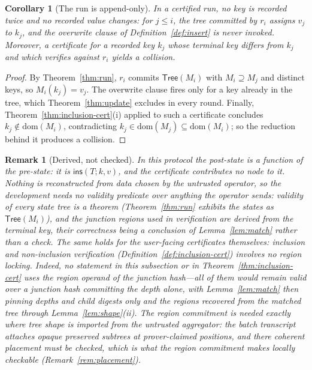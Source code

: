 \documentclass[11pt]{article}
\newtheorem{corollary}{Corollary}
\newtheorem{remark}{Remark}
\begin{document}
\begin{corollary}[The run is append-only]
\label{cor:run-append}
In a certified run, no key is recorded twice and no recorded value changes: for $j \le i$, the tree committed by $r_i$ assigns $v_j$ to $k_j$, and the overwrite clause of Definition~\ref{def:insert} is never invoked. Moreover, a certificate for a recorded key $k_j$ whose terminal key differs from $k_j$ and which verifies against $r_i$ yields a collision.
\end{corollary}
\begin{proof}
By Theorem~\ref{thm:run}, $r_i$ commits $\mathsf{Tree}(M_i)$ with $M_i \supseteq M_j$ and distinct keys, so $M_i(k_j) = v_j$. The overwrite clause fires only for a key already in the tree, which Theorem~\ref{thm:update} excludes in every round. Finally, Theorem~\ref{thm:inclusion-cert}(i) applied to such a certificate concludes $k_j \notin \mathrm{dom}(M_i)$, contradicting $k_j \in \mathrm{dom}(M_j) \subseteq \mathrm{dom}(M_i)$; so the reduction behind it produces a collision.
\end{proof}

\begin{remark}[Derived, not checked]
\label{rem:derived-vs-checked}
In this protocol the post-state is a function of the pre-state: it is $\mathsf{ins}(T;k,v)$, and the certificate contributes no node to it. Nothing is reconstructed from data chosen by the untrusted operator, so the development needs no validity predicate over anything the operator sends: validity of every state tree is a theorem (Theorem~\ref{thm:run} exhibits the states as $\mathsf{Tree}(M_i)$), and the junction regions used in verification are derived from the terminal key, their correctness being a conclusion of Lemma~\ref{lem:match} rather than a check. The same holds for the user-facing certificates themselves: inclusion and non-inclusion verification (Definition~\ref{def:inclusion-cert}) involves no region locking. Indeed, no statement in this subsection or in Theorem~\ref{thm:inclusion-cert} uses the region operand of the junction hash---all of them would remain valid over a junction hash committing the depth alone, with Lemma~\ref{lem:match} then pinning depths and child digests only and the regions recovered from the matched tree through Lemma~\ref{lem:shape}(ii). The region commitment is needed exactly where tree shape is imported from the untrusted aggregator: the batch transcript attaches opaque preserved subtrees at prover-claimed positions, and there coherent placement must be \emph{checked}, which is what the region commitment makes locally checkable (Remark~\ref{rem:placement}).
\end{remark}
\end{document}
